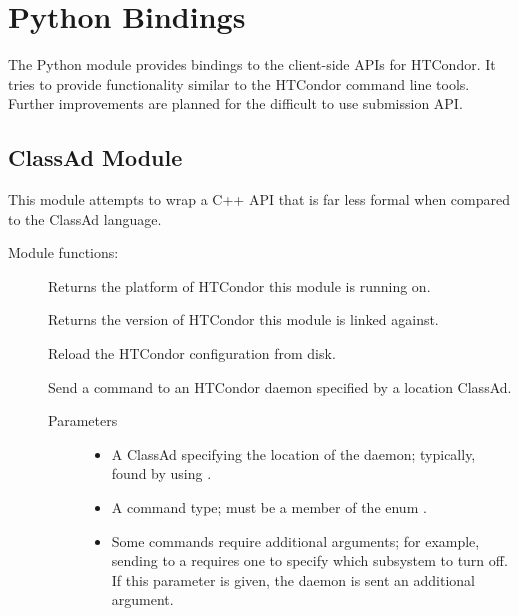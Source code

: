 \section{\label{API-Python} Python Bindings}

The Python module provides bindings to the client-side APIs for HTCondor.  
It tries to provide functionality similar to the HTCondor command line tools.
Further improvements are planned for the difficult to use submission API.

\subsection{\label{Python-ClassAd} ClassAd Module}
This module attempts to wrap a C++ API that is
far less formal when compared to the ClassAd language.

Module functions:
%
%
\begin{description}
\item []
  Returns the platform of HTCondor this module is running on.
  
\item []
  Returns the version of HTCondor this module is linked against.

\item []
  Reload the HTCondor configuration from disk.

\item []
  Send a command to an HTCondor daemon specified by a location ClassAd.

  \begin{description}
    \item[ Parameters]
    \begin{itemize}
      \item {} A ClassAd specifying the location of the daemon; 
      typically, found by using .
      \item {} A command type; 
      must be a member of the enum .
      \item {} Some commands require additional arguments; 
      for example, sending  to a  requires 
      one to specify which subsystem to turn off.  
      If this parameter is given, the daemon is sent an additional argument.
    \end{itemize}
  \end{description}  

\end{description}

